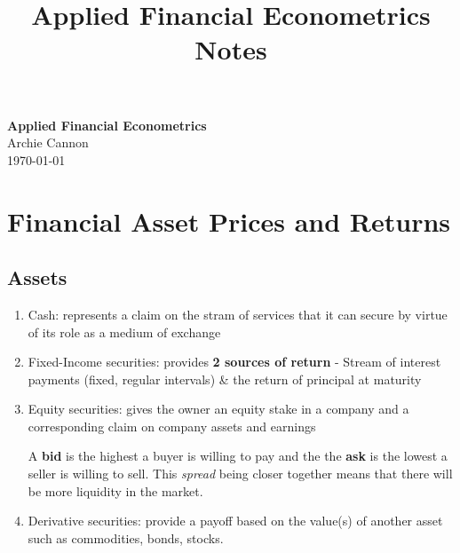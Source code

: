\documentclass[11pt]{article}
\begin{document}
\title{Applied Financial Econometrics Notes}

\thispagestyle{empty}

\begin{center}
{\LARGE \bf Applied Financial Econometrics}\\
{\large Archie Cannon}\\
\today
\end{center}

{
\begin{tcolorbox}[title=Contents, fonttitle=\huge\sffamily\bfseries\selectfont,interior style={left color=contcol1!50!white,right color=contcol2!50!white},frame style={left color=contcol1!80!white,right color=contcol2!80!white},coltitle=black,top=2mm,bottom=2mm,left=2mm,right=2mm,drop fuzzy shadow,enhanced,breakable]
\makeatletter
{}
\makeatother
\end{tcolorbox}}

\newpage

\section{Financial Asset Prices and Returns}

\subsection{Assets}

\begin{enumerate}
    \item Cash: represents a claim on the stram of services that it can secure by virtue of its role as a medium of exchange
    \item Fixed-Income securities: provides \textbf{2 sources of return} - Stream of interest payments (fixed, regular intervals) \& the return of principal at maturity
    \item Equity securities: gives the owner an equity stake in a company and a corresponding claim on company assets and earnings
    \begin{note}
    A \textbf{bid} is the highest a buyer is willing to pay and the the \textbf{ask} is the lowest a seller is willing to sell. This \textit{spread} being closer together means that there will be more liquidity in the market.
    \end{note}
    \item Derivative securities: provide a payoff based on the value(s) of another asset such as commodities, bonds, stocks.
\end{enumerate}
\end{document}
